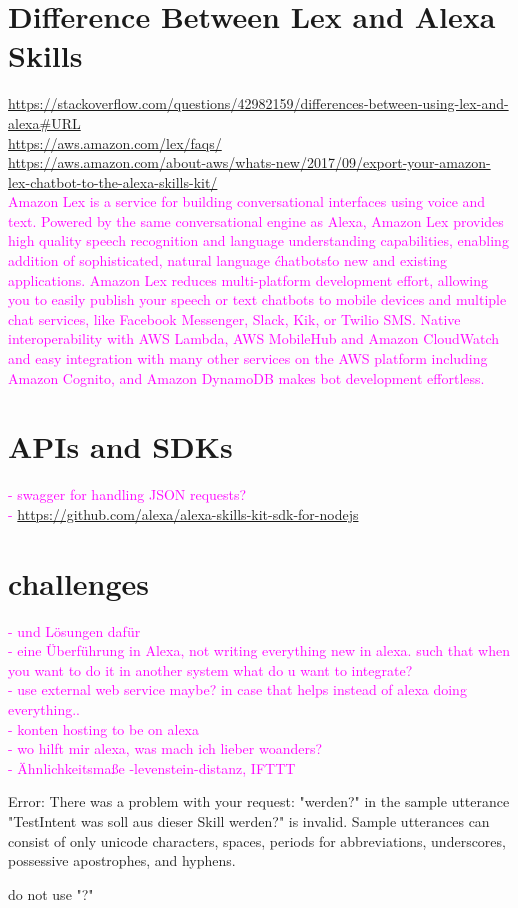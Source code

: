 \section{Difference Between Lex and Alexa Skills}  
\url{https://stackoverflow.com/questions/42982159/differences-between-using-lex-and-alexa#URL}\\
\url{https://aws.amazon.com/lex/faqs/}\\
\url{https://aws.amazon.com/about-aws/whats-new/2017/09/export-your-amazon-lex-chatbot-to-the-alexa-skills-kit/}\\
\textcolor{magenta}{Amazon Lex is a service for building conversational interfaces using voice and text. Powered by the same conversational engine as Alexa, Amazon Lex provides high quality speech recognition and language understanding capabilities, enabling addition of sophisticated, natural language \'chatbots\' to new and existing applications. Amazon Lex reduces multi-platform development effort, allowing you to easily publish your speech or text chatbots to mobile devices and multiple chat services, like Facebook Messenger, Slack, Kik, or Twilio SMS. Native interoperability with AWS Lambda, AWS MobileHub and Amazon CloudWatch and easy integration with many other services on the AWS platform including Amazon Cognito, and Amazon DynamoDB makes bot development effortless.}


\section{APIs and SDKs}

\textcolor{magenta}{
- swagger for handling JSON requests?\\
- \url{https://github.com/alexa/alexa-skills-kit-sdk-for-nodejs}
}

\section{challenges}

\textcolor{magenta}{
- und L\"osungen daf\"ur\\
- eine \"Uberf\"uhrung in Alexa, not writing everything new in alexa. such that when you want to do it in another system what do u want to integrate?\\
- use external web service maybe? in case that helps instead of alexa doing everything..\\
- konten hosting to be on alexa\\
- wo hilft mir alexa, was mach ich lieber woanders?\\
- \"Ahnlichkeitsma{\ss}e -levenstein-distanz, IFTTT
}


Error: There was a problem with your request: "werden?" in the sample utterance "TestIntent was soll aus dieser Skill werden?" is invalid. Sample utterances can consist of only unicode characters, spaces, periods for abbreviations, underscores, possessive apostrophes, and hyphens.

do not use "?"
